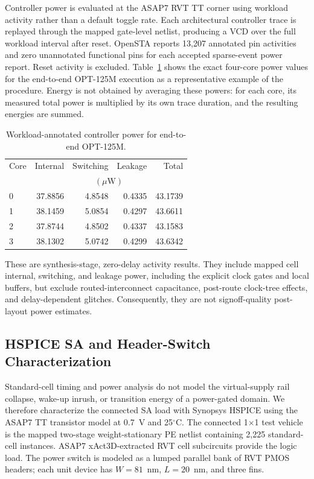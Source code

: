 Controller power is evaluated at the ASAP7 RVT TT corner using workload
activity rather than a default toggle rate.  Each architectural controller
trace is replayed through the mapped gate-level netlist, producing a VCD over
the full workload interval after reset.  OpenSTA reports 13,207 annotated pin
activities and zero unannotated functional pins for each accepted sparse-event
power report.  Reset activity is excluded.  Table~\ref{tab:controller-power-example}
shows the exact four-core power values for the end-to-end OPT-125M execution
as a representative example of the procedure.  Energy is not obtained by
averaging these powers: for each core, its measured total power is multiplied
by its own trace duration, and the resulting energies are summed.

\begin{table}[t]
  \centering
  \caption{Workload-annotated controller power for end-to-end OPT-125M.}
  \label{tab:controller-power-example}
  \begin{tabular}{lrrrr}
    \toprule
    Core & Internal & Switching & Leakage & Total \\
         & \multicolumn{4}{c}{$(\mu\mathrm{W})$} \\
    \midrule
    0 & 37.8856 & 4.8548 & 0.4335 & 43.1739 \\
    1 & 38.1459 & 5.0854 & 0.4297 & 43.6611 \\
    2 & 37.8744 & 4.8502 & 0.4337 & 43.1583 \\
    3 & 38.1302 & 5.0742 & 0.4299 & 43.6342 \\
    \bottomrule
  \end{tabular}
\end{table}

These are synthesis-stage, zero-delay activity results.  They include mapped
cell internal, switching, and leakage power, including the explicit clock
gates and local buffers, but exclude routed-interconnect capacitance,
post-route clock-tree effects, and delay-dependent glitches.  Consequently,
they are not signoff-quality post-layout power estimates.

\subsection{HSPICE SA and Header-Switch Characterization}
\label{sec:hspice-characterization}

Standard-cell timing and power analysis do not model the virtual-supply rail
collapse, wake-up inrush, or transition energy of a power-gated domain.  We
therefore characterize the connected SA load with Synopsys HSPICE using the
ASAP7 TT transistor model at 0.7~V and 25$^{\circ}$C.  The connected 1$\times$1
test vehicle is the mapped two-stage weight-stationary PE netlist containing
2,225 standard-cell instances.  ASAP7 xAct3D-extracted RVT cell subcircuits
provide the logic load.  The power switch is modeled as a lumped parallel bank
of RVT PMOS headers; each unit device has $W=81$~nm, $L=20$~nm, and three fins.

